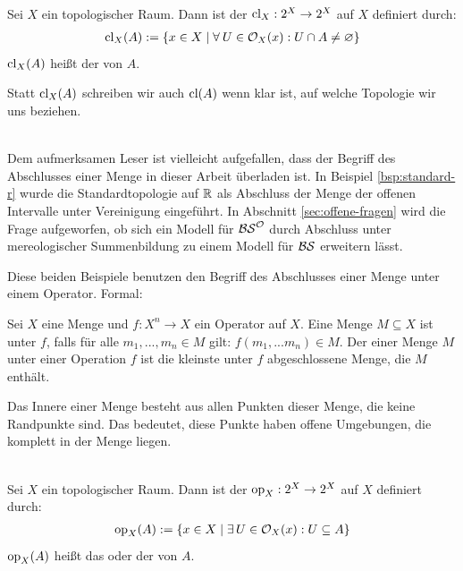     \begin{dfn}\label{def:abschl} \ \\
        Sei $X$ ein topologischer Raum. Dann ist der  $\text{cl}_X : 2^X \rightarrow 2^X$ auf $X$ definiert durch:
        \begin{align*}
            \text{cl}_X(A) := \{x \in X \mid \forall\: U \in \mathcal{O}_X(x) : U \cap A \neq \varnothing \}
        \end{align*}
        $\text{cl}_X(A)$ heißt der  von $A$.
    \end{dfn}
    \begin{konv}
        Statt $\text{cl}_X(A)$ schreiben wir auch $\text{cl}(A)$ wenn klar ist, auf welche Topologie wir uns beziehen.
    \end{konv}
    
    \begin{bem}\ \\
        Dem aufmerksamen Leser ist vielleicht aufgefallen, dass der Begriff des Abschlusses einer Menge in dieser Arbeit überladen ist.
        In Beispiel \ref{bsp:standard-r} wurde die Standardtopologie auf $\mathbb{R}$ als Abschluss der Menge der offenen Intervalle unter Vereinigung eingeführt.
        In Abschnitt \ref{sec:offene-fragen} wird die Frage aufgeworfen, ob sich ein Modell für $\mathcal{BS}^{\mathcal{O}}$ durch Abschluss unter mereologischer Summenbildung zu einem Modell für $\mathcal{BS}$ erweitern lässt.
        
        Diese beiden Beispiele benutzen den Begriff des Abschlusses einer Menge unter einem Operator. Formal:
        
        Sei $X$ eine Menge und $f: X^n \to X$ ein Operator auf $X$.
        Eine Menge $M \subseteq X$ ist  unter $f$, falls für alle $m_1, ... , m_n \in M$ gilt: $f(m_1, ... m_n) \in M$.
        Der  einer Menge $M$ unter einer Operation $f$ ist die kleinste unter $f$ abgeschlossene Menge, die $M$ enthält.
    \end{bem}


    Das
    Innere einer Menge besteht aus allen Punkten dieser Menge, die keine Randpunkte sind. Das bedeutet, diese Punkte haben offene Umgebungen, die komplett in der Menge liegen.

    \begin{dfn} \label{def:kern} \ \\
        Sei $X$ ein topologischer Raum. Dann ist der  $\text{op}_X : 2^X \rightarrow 2^X$ auf $X$ definiert durch:
        \begin{align*}
            \text{op}_X(A) := \{x \in X \mid \exists \, U \in \mathcal{O}_X(x) : U \subseteq A \}
        \end{align*}
        $\text{op}_X(A)$ heißt das  oder der  von $A$.

    \end{dfn}

